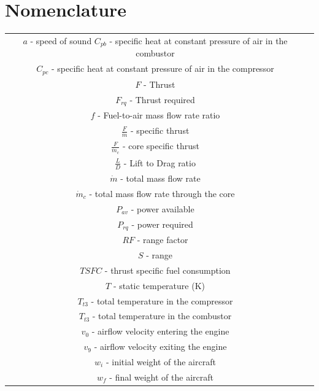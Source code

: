 \documentclass[12pt]{report}
\begin{document}
\newpage
\tableofcontents
\listoffigures
\listoftables





\newpage
 \chapter*{Nomenclature}



\begin{table}[H]
    \centering
    \begin{tabular}{c l}

     $a$ - speed of sound
     $C_{pb}$ - specific heat at constant pressure of air in the combustor\\ 
     $C_{pc}$ - specific heat at constant pressure of air in the compressor\\
     $F$ - Thrust\\ 
     $F_{rq}$ - Thrust required\\
     $f$ - Fuel-to-air mass flow rate ratio\\
     $\frac{F}{\dot m}$ - specific thrust\\
     $\frac{F}{\dot m_{c}}$ - core specific thrust\\
     $\frac{L}{D}$ - Lift to Drag ratio\\
     $\dot m$ - total mass flow rate\\
     $\dot m_{c}$ - total mass flow rate through the core\\
     $P_{av}$ - power available\\
     $P_{rq}$ - power required\\
     $RF$ - range factor\\
     $S$ - range\\
     $TSFC$ - thrust specific fuel consumption\\
     $T$ - static temperature (K)\\
     $T_{t3}$ - total temperature in the compressor\\
     $T_{t3}$ - total temperature in the combustor\\
     $v_{0}$ - airflow velocity entering the engine\\
     $v_{9}$ - airflow velocity exiting the engine\\
     $w_{i}$ - initial weight of the aircraft\\
     $w_{f}$ - final weight of the aircraft\\
         \end{tabular}
\end{table}
\end{document}
